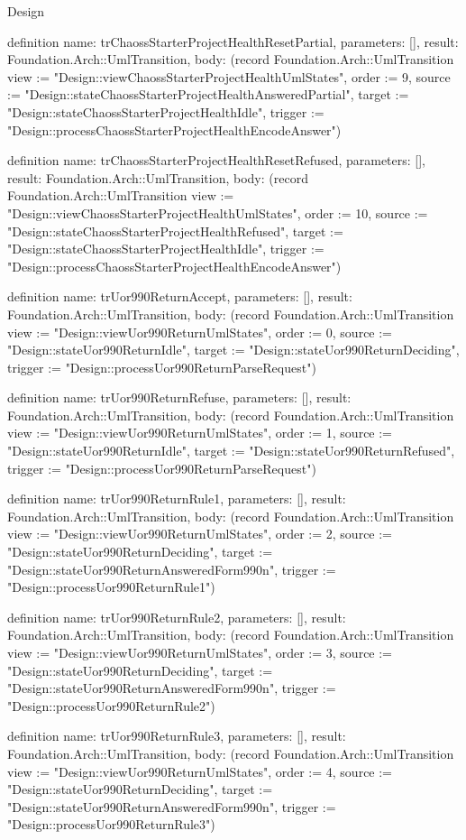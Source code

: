 \begin{lexlean}{Design}
\begin{semanticmodule}
definition{
  name: trChaossStarterProjectHealthResetPartial,
  parameters: [],
  result: Foundation.Arch::UmlTransition,
  body: (record Foundation.Arch::UmlTransition {view := "Design::viewChaossStarterProjectHealthUmlStates", order := 9, source := "Design::stateChaossStarterProjectHealthAnsweredPartial", target := "Design::stateChaossStarterProjectHealthIdle", trigger := "Design::processChaossStarterProjectHealthEncodeAnswer"})
}

definition{
  name: trChaossStarterProjectHealthResetRefused,
  parameters: [],
  result: Foundation.Arch::UmlTransition,
  body: (record Foundation.Arch::UmlTransition {view := "Design::viewChaossStarterProjectHealthUmlStates", order := 10, source := "Design::stateChaossStarterProjectHealthRefused", target := "Design::stateChaossStarterProjectHealthIdle", trigger := "Design::processChaossStarterProjectHealthEncodeAnswer"})
}

definition{
  name: trUor990ReturnAccept,
  parameters: [],
  result: Foundation.Arch::UmlTransition,
  body: (record Foundation.Arch::UmlTransition {view := "Design::viewUor990ReturnUmlStates", order := 0, source := "Design::stateUor990ReturnIdle", target := "Design::stateUor990ReturnDeciding", trigger := "Design::processUor990ReturnParseRequest"})
}

definition{
  name: trUor990ReturnRefuse,
  parameters: [],
  result: Foundation.Arch::UmlTransition,
  body: (record Foundation.Arch::UmlTransition {view := "Design::viewUor990ReturnUmlStates", order := 1, source := "Design::stateUor990ReturnIdle", target := "Design::stateUor990ReturnRefused", trigger := "Design::processUor990ReturnParseRequest"})
}

definition{
  name: trUor990ReturnRule1,
  parameters: [],
  result: Foundation.Arch::UmlTransition,
  body: (record Foundation.Arch::UmlTransition {view := "Design::viewUor990ReturnUmlStates", order := 2, source := "Design::stateUor990ReturnDeciding", target := "Design::stateUor990ReturnAnsweredForm990n", trigger := "Design::processUor990ReturnRule1"})
}

definition{
  name: trUor990ReturnRule2,
  parameters: [],
  result: Foundation.Arch::UmlTransition,
  body: (record Foundation.Arch::UmlTransition {view := "Design::viewUor990ReturnUmlStates", order := 3, source := "Design::stateUor990ReturnDeciding", target := "Design::stateUor990ReturnAnsweredForm990n", trigger := "Design::processUor990ReturnRule2"})
}

definition{
  name: trUor990ReturnRule3,
  parameters: [],
  result: Foundation.Arch::UmlTransition,
  body: (record Foundation.Arch::UmlTransition {view := "Design::viewUor990ReturnUmlStates", order := 4, source := "Design::stateUor990ReturnDeciding", target := "Design::stateUor990ReturnAnsweredForm990n", trigger := "Design::processUor990ReturnRule3"})
}


\end{semanticmodule}
\end{lexlean}
